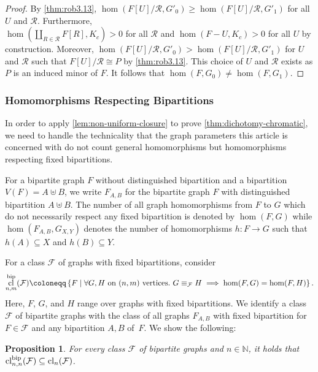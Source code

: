 \documentclass[10pt,a4paper]{article}
\theoremstyle{definition}
\theoremstyle{plain}
\newtheorem{proposition}[definition]{Proposition}
\theoremstyle{remark}
\DeclareMathOperator{\cl}{cl}
\begin{document}
\begin{proof}
		By \cref{thm:rob3.13},
		$\hom(F[U]/\mathcal{R}, G'_0) \geq \hom(F[U]/\mathcal{R}, G'_1)$
		for all $U$ and $\mathcal{R}$.
		Furthermore,\\ $\hom(\coprod_{R \in \mathcal{R}} F[R], K_c) > 0$ for all $\mathcal{R}$ and $\hom(F - U, K_c)  > 0$ for all $U$ by construction.
		Moreover, $\hom(F[U]/\mathcal{R}, G'_0) > \hom(F[U]/\mathcal{R}, G'_1)$ for $U$ and $\mathcal{R}$ such that $F[U]/\mathcal{R} \cong P$ by \cref{thm:rob3.13}.
		This choice of $U$ and $\mathcal{R}$ exists as $P$ is an induced minor of $F$.
		It follows that $\hom(F, G_0) \neq \hom(F, G_1)$.
	\end{proof}
	
	
	\subsubsection{Homomorphisms Respecting Bipartitions}
	\label{sec:bipartite-respecting}
	
	In order to apply \cref{lem:non-uniform-closure} 
	to prove \cref{thm:dichotomy-chromatic},
	we need to handle the technicality that the graph parameters this article is concerned with do not count general homomorphisms but homomorphisms respecting fixed bipartitions.
	
	For a bipartite graph $F$ without distinguished bipartition and a bipartition $V(F) = A \uplus B$,
	we write $F_{A, B}$ for the bipartite graph $F$ with distinguished bipartition $A \uplus B$.
	The number of all graph homomorphisms
	from $F$ to $G$  which do not necessarily respect any fixed bipartition is denoted by $\hom(F, G)$ while $\hom(F_{A, B}, G_{X, Y})$ denotes the number of homomorphisms $h \colon F \to G$ such that $h(A) \subseteq X$ and $h(B) \subseteq Y$.
	
	
	For a class $\mathcal{F}$ of graphs with fixed bipartitions, consider
	\[
		\cl_{n,m}^{\textup{bip}}(\mathcal{F})
		\coloneqq \left\{F \mid \forall G, H \text{ on $(n,m)$ vertices}.\ G \equiv_{\mathcal{F}} H \implies \hom(F, G) = \hom(F,H) \right\}.
	\]
	Here, $F$, $G$, and $H$ range over graphs with fixed bipartitions.
	We identify a class $\mathcal{F}$ of bipartite graphs with the class of all graphs $F_{A,B}$ with fixed bipartition for $F \in \mathcal{F}$ and any bipartition $A,B$ of~$F$. 
	We show the following:
	\begin{proposition}\label{prop:bip-cl}
		For every class $\mathcal{F}$ of bipartite graphs
		and $n \in \mathbb{N}$,
		it holds that
		$\cl_{n,n}^{\textup{bip}}(\mathcal{F}) \subseteq \cl_n(\mathcal{F})$.
	\end{proposition}
	
\end{document}
